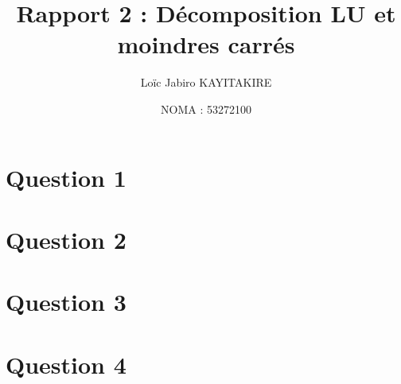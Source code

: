 \documentclass[11pt]{article}
\title{Rapport 2 : Décomposition LU et moindres carrés}
\author{Loïc Jabiro KAYITAKIRE}
\date{NOMA : 53272100}
\begin{document}
\maketitle

\section*{Question 1}

\section*{Question 2}

\section*{Question 3}

\section*{Question 4}
\end{document}
